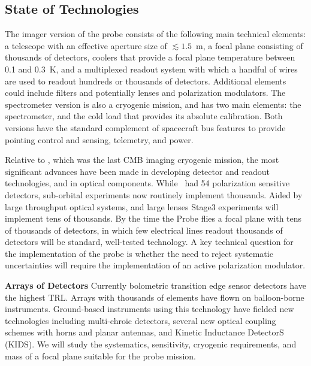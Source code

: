 
\subsection{State of Technologies}
\label{sec:technologies}

\vspace{-0.05in}

The imager version of the probe consists of the following main technical elements: a telescope with an effective aperture size 
of $\lesssim1.5$~m, a focal plane consisting of thousands of detectors, coolers that provide a focal plane temperature between 0.1 and 0.3~K, 
and a multiplexed readout system with which a handful of wires are used to readout hundreds or thousands of detectors. Additional 
elements could include filters and potentially lenses and polarization modulators. 
The spectrometer version is also a cryogenic mission, and has two main elements: the spectrometer, and the cold load that provides its
absolute calibration. Both versions have the standard complement of spacecraft bus features to provide pointing control 
and sensing, telemetry, and power. 

Relative to \planck, which was the last CMB imaging cryogenic mission, the most significant advances have been made in 
developing detector and readout technologies, and in optical components. While \planck\ had 54 polarization 
sensitive detectors, sub-orbital experiments now routinely implement thousands. Aided by large throughput optical 
systems, and large lenses Stage3 experiments will implement
tens of thousands. By the time the Probe flies a focal plane with tens of thousands 
of detectors, in which few electrical lines readout thousands of detectors will be standard, well-tested technology. 
A key technical question for the implementation of the probe is whether the need to reject systematic uncertainties 
will require the implementation of an active polarization modulator. 

{\bf Arrays of Detectors} \hspace{0.1in} Currently bolometric transition edge sensor detectors have the highest TRL. Arrays
with thousands of elements have flown on balloon-borne instruments. Ground-based instruments using this 
technology have fielded new technologies including multi-chroic detectors, several new optical coupling schemes with horns and planar antennas, and Kinetic Inductance DetectorS (KIDS).   We will study the systematics, sensitivity, cryogenic requirements, and mass of a focal plane suitable for the probe mission.


